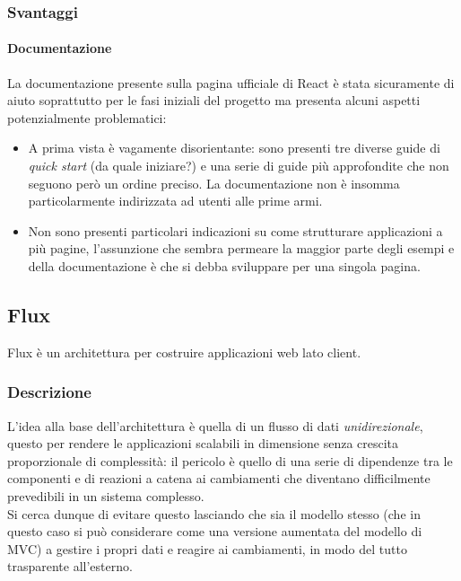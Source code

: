 \subsubsection{Svantaggi}

\paragraph{Documentazione}
La documentazione presente sulla pagina ufficiale di React è stata sicuramente di aiuto
soprattutto per le fasi iniziali del progetto ma presenta alcuni aspetti potenzialmente
problematici:

\begin{itemize}
\item A prima vista è vagamente disorientante: sono presenti tre diverse guide di
\textit{quick start} (da quale iniziare?) e una serie di guide più approfondite che
non seguono però un ordine preciso. La documentazione non è insomma particolarmente
indirizzata ad utenti alle prime armi.
\item Non sono presenti particolari indicazioni su come strutturare applicazioni
a più pagine, l'assunzione che sembra permeare la maggior parte degli esempi e della
documentazione è che si debba sviluppare per una singola pagina.
\end{itemize}

\subsection{Flux}\label{flux}

Flux è un architettura per costruire applicazioni web lato client.

\subsubsection{Descrizione}
L'idea alla base dell'architettura è quella di un flusso di dati \textit{unidirezionale},
questo per rendere le applicazioni scalabili in dimensione senza crescita proporzionale
di complessità: il pericolo è quello di una serie di dipendenze tra le componenti e di reazioni
a catena ai cambiamenti che diventano difficilmente prevedibili in un sistema complesso. \\
Si cerca dunque di evitare questo lasciando che sia il modello stesso (che in questo caso
si può considerare come una versione aumentata del modello di MVC) a gestire i propri dati
e reagire ai cambiamenti, in modo del tutto trasparente all'esterno. \\

